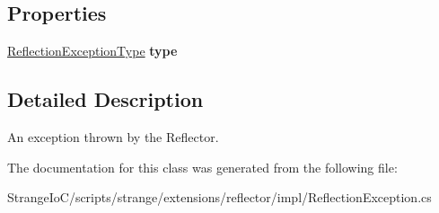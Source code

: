 \subsection*{Properties}
\begin{DoxyCompactItemize}
\item 
\hypertarget{classstrange_1_1extensions_1_1reflector_1_1impl_1_1_reflection_exception_a7d966c5d78022218025524fc16de5f6c}{\hyperlink{namespacestrange_1_1extensions_1_1reflector_1_1api_a4470d7d3edf61dfa229aec6e9a914159}{Reflection\-Exception\-Type} {\bfseries type}}\label{classstrange_1_1extensions_1_1reflector_1_1impl_1_1_reflection_exception_a7d966c5d78022218025524fc16de5f6c}

\end{DoxyCompactItemize}


\subsection{Detailed Description}
An exception thrown by the Reflector. 

The documentation for this class was generated from the following file\-:\begin{DoxyCompactItemize}
\item 
Strange\-Io\-C/scripts/strange/extensions/reflector/impl/Reflection\-Exception.\-cs\end{DoxyCompactItemize}
